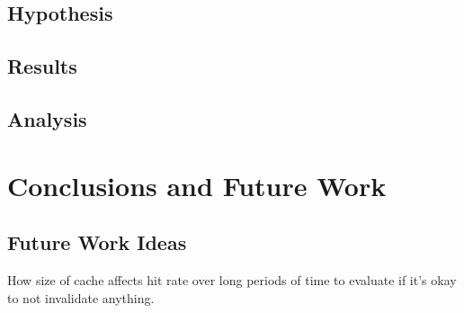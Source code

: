 \documentclass[12pt]{ucthesis}
\begin{document}
\section{Hypothesis}

\section{Results}

\section{Analysis}


\chapter{Conclusions and Future Work} \label{conclusions}


\section{Future Work Ideas}
How size of cache affects hit rate over long periods of time to evaluate if it's okay to not invalidate anything.



\clearpage


\end{document}
